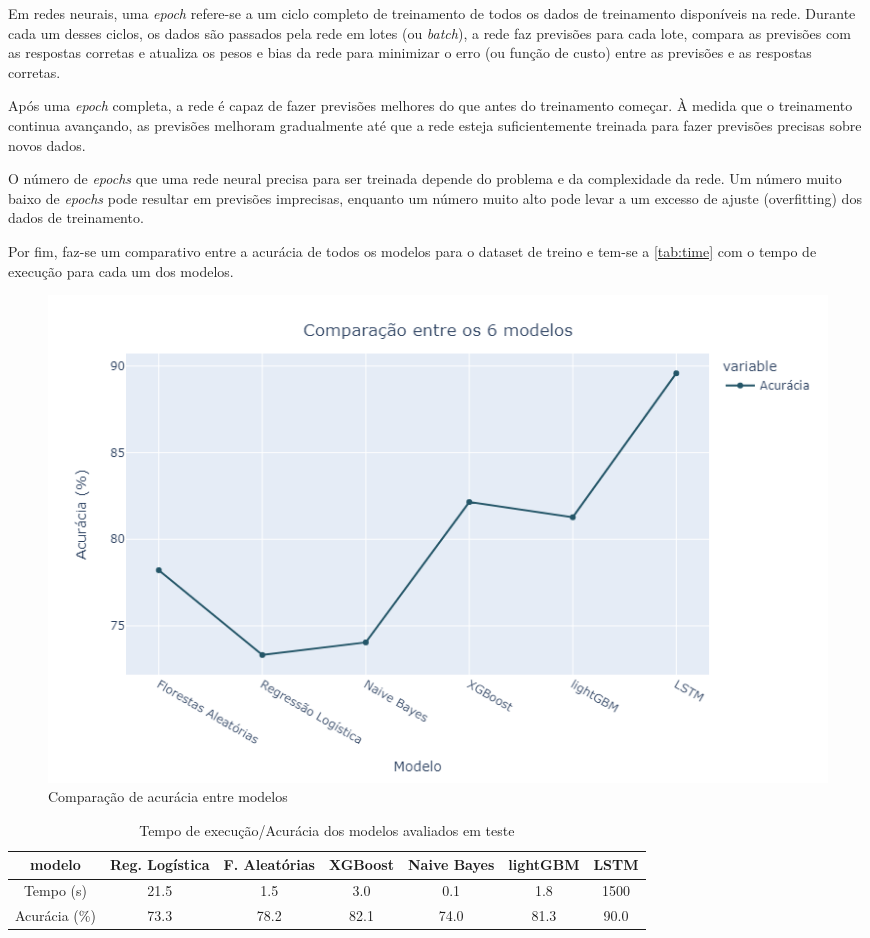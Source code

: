 Em redes neurais, uma \textit{epoch} refere-se a um ciclo completo de treinamento de todos os dados de treinamento disponíveis na rede. Durante cada um desses ciclos, os dados são passados pela rede em lotes (ou \textit{batch}), a rede faz previsões para cada lote, compara as previsões com as respostas corretas e atualiza os pesos e bias da rede para minimizar o erro (ou função de custo) entre as previsões e as respostas corretas.

Após uma \textit{epoch} completa, a rede é capaz de fazer previsões melhores do que antes do treinamento começar. À medida que o treinamento continua avançando, as previsões melhoram gradualmente até que a rede esteja suficientemente treinada para fazer previsões precisas sobre novos dados.

O número de \textit{epochs} que uma rede neural precisa para ser treinada depende do problema e da complexidade da rede. Um número muito baixo de \textit{epochs} pode resultar em previsões imprecisas, enquanto um número muito alto pode levar a um excesso de ajuste (overfitting) dos dados de treinamento.

Por fim, faz-se um comparativo entre a acurácia de todos os modelos para o dataset de treino e tem-se a \autoref{tab:time} com o tempo de execução para cada um dos modelos.

\begin{figure}[H]
    \centering
    \includegraphics[scale=0.55]{./figs/comparative.png}
    \caption{Comparação de acurácia entre modelos}
    \label{fig:comparative}
\end{figure}

\begin{table}[H]
    \centering
    \small
    \begin{tabular}{c|cccccc}
        \hline
        { modelo}        & { Reg. Logística} & { F. Aleatórias} & { XGBoost} & { Naive Bayes} & lightGBM & LSTM \\ \hline \hline
        { Tempo (s)}     & { 21.5}           & { 1.5}           & { 3.0}     & { 0.1}         & {1.8}    & 1500 \\ \hline
        { Acurácia (\%)} & { 73.3}           & { 78.2}          & { 82.1}    & { 74.0}        & 81.3     & 90.0 \\
    \end{tabular}
    \caption{Tempo de execução/Acurácia dos modelos avaliados em teste}
    \label{tab:time}
\end{table}

